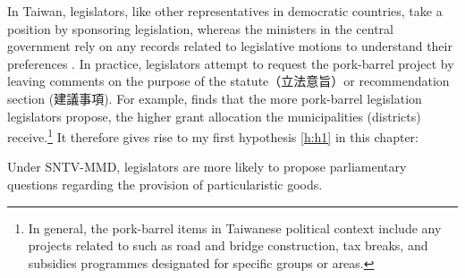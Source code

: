 In Taiwan, legislators, like other representatives in democratic countries, take a position by sponsoring legislation, whereas the ministers in the central government rely on any records related to legislative motions to understand their preferences \citep{Luor2008}. In practice, legislators attempt to request the pork-barrel project by leaving comments on the purpose of the statute（立法意旨）or recommendation section (建議事項). For example, \citet{Luor2009} finds that the more pork-barrel legislation legislators propose, the higher grant allocation the municipalities (districts) receive.\footnote{In general, the pork-barrel items in Taiwanese political context include any projects related to such as road and bridge construction, tax breaks, and subsidies programmes designated for specific groups or areas.} It therefore gives rise to my first hypothesis \ref{h:h1} in this chapter:


\begin{hyptwo}
Under SNTV-MMD, legislators are more likely to propose parliamentary questions regarding the provision of particularistic goods.
\label{h:h1} 
\end{hyptwo}





